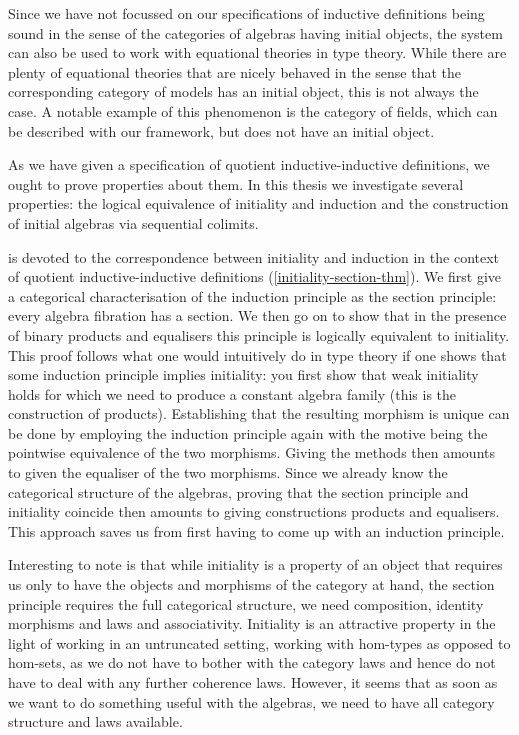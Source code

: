 Since we have not focussed on our specifications of inductive
definitions being sound in the sense of the categories of algebras
having initial objects, the system can also be used to work with
equational theories in type theory. While there are plenty of
equational theories that are nicely behaved in the sense that the
corresponding category of models has an initial object, this is not
always the case. A notable example of this phenomenon is the category
of fields, which can be described with our framework, but does not
have an initial object.

As we have given a specification of quotient inductive-inductive
definitions, we ought to prove properties about them. In this thesis
we investigate several properties: the logical equivalence of
initiality and induction and the construction of initial algebras via
sequential colimits.

 is devoted to the correspondence between initiality
and induction in the context of quotient inductive-inductive
definitions (\cref{initiality-section-thm}). We first give a
categorical characterisation of the induction principle as the section
principle: every algebra fibration has a section. We then go on to
show that in the presence of binary products and equalisers this
principle is logically equivalent to initiality. This proof follows
what one would intuitively do in type theory if one shows that some
induction principle implies initiality: you first show that weak
initiality holds for which we need to produce a constant algebra
family (this is the construction of products). Establishing that the
resulting morphism is unique can be done by employing the induction
principle again with the motive being the pointwise equivalence of the
two morphisms. Giving the methods then amounts to given the equaliser
of the two morphisms. Since we already know the categorical structure
of the algebras, proving that the section principle and initiality
coincide then amounts to giving constructions products and
equalisers. This approach saves us from first having to come up with
an induction principle.

Interesting to note is that while initiality is a property of an
object that requires us only to have the objects and morphisms of the
category at hand, the section principle requires the full categorical
structure, \ie we need composition, identity morphisms and laws and
associativity. Initiality is an attractive property in the light of
working in an untruncated setting, \ie working with hom-types as
opposed to hom-sets, as we do not have to bother with the category
laws and hence do not have to deal with any further coherence
laws. However, it seems that as soon as we want to do something useful
with the algebras, we need to have all category structure and laws
available.

